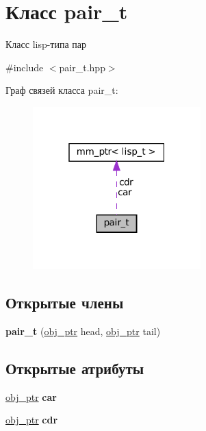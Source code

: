 \hypertarget{classpair__t}{}\section{Класс pair\+\_\+t}
\label{classpair__t}


Класс lisp-\/типа пар  




{\ttfamily \#include $<$pair\+\_\+t.\+hpp$>$}



Граф связей класса pair\+\_\+t\+:\nopagebreak
\begin{figure}[H]
\begin{center}
\leavevmode
\includegraphics[width=184pt]{classpair__t__coll__graph}
\end{center}
\end{figure}
\subsection*{Открытые члены}
\begin{DoxyCompactItemize}
\item 
\mbox{\label{classpair__t_adfa4aeb35f04b8d9efdd4e6d770feed9}} 
{\bfseries pair\+\_\+t} (\mbox{\hyperlink{classmm__ptr}{obj\+\_\+ptr}} head, \mbox{\hyperlink{classmm__ptr}{obj\+\_\+ptr}} tail)
\end{DoxyCompactItemize}
\subsection*{Открытые атрибуты}
\begin{DoxyCompactItemize}
\item 
\mbox{\label{classpair__t_a94511da44f476f4e3ec370939e9dfc3b}} 
\mbox{\hyperlink{classmm__ptr}{obj\+\_\+ptr}} {\bfseries car}
\item 
\mbox{\label{classpair__t_a2064f2bd5085d7c589b56e76137ccf57}} 
\mbox{\hyperlink{classmm__ptr}{obj\+\_\+ptr}} {\bfseries cdr}
\end{DoxyCompactItemize}


